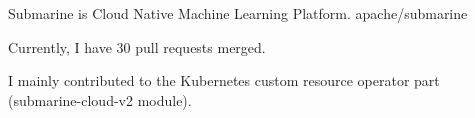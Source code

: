 

\begin{cventries}

  \cventry
    {Submarine is Cloud Native Machine Learning Platform.}
    {apache/submarine \href{https://github.com/apache/submarine}{\color{red}{[Github Link]}}}
    {}
    {} %
    {
      \begin{cvitems} %
        \item {Currently, I have 30 pull requests merged.}
        \item {I mainly contributed to the Kubernetes custom resource operator part (submarine-cloud-v2 module).}
      \end{cvitems}
    }

\end{cventries}
